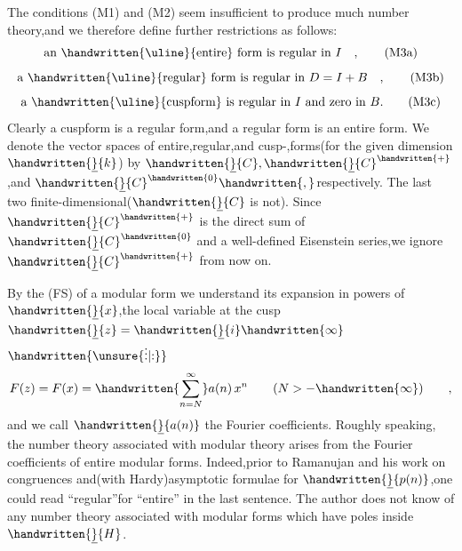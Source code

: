 The conditions (M1) and (M2) seem insufficient to produce much number theory,and we therefore define further restrictions as follows:
\[
\text{an \handwritten{\uline}{entire} form is regular in } I\quad ,
\tag*{(M3a)}
\]
\[
\text{a \handwritten{\uline}{regular} form is regular in } D=I+B\quad ,
\tag*{(M3b)}
\]
\[
\text{a \handwritten{\uline}{cuspform} is regular in } I \text{ and zero in } B.
\tag*{(M3c)}
\]
Clearly a cuspform is a regular form,and a regular form is an entire form. We denote the vector spaces of entire,regular,and cusp-,forms(for the given dimension $\handwritten{\underline}{k}$) by $\handwritten{\underline}{C},\handwritten{\underline}{C}^{\handwritten{+}}$,and $\handwritten{\underline}{C}^{\handwritten{0}}\handwritten{,}$respectively. The last two  finite-dimensional($\handwritten{\underline}{C}$ is not). Since $\handwritten{\underline}{C}^{\handwritten{+}}$ is the direct sum of $\handwritten{\underline}{C}^{\handwritten{0}}$ and a well-defined Eisenstein series,we ignore $\handwritten{\underline}{C}^{\handwritten{+}}$ from now on.

By the   (FS)\unsure{-} of a modular form we understand its expansion in powers of $\handwritten{\underline}{x}$,the local variable at the cusp $\handwritten{\underline}{z}=\handwritten{\underline}{i}\handwritten{\infty}$ $\handwritten{\unsure{\vdots|\mathord{:}}}$
\[
F(z)=F(x)=\handwritten{\sum_{n=N}^{\infty}}a(n)\,x^{n}\qquad (N>-\handwritten{\infty})\qquad ,
\]
and we call \reversemarginpar{}\normalmarginpar $\handwritten{\underline}{a(n)}$ the Fourier coefficients. Roughly speaking, the number theory associated with modular theory arises from the Fourier coefficients of entire modular forms. Indeed,prior to Ramanujan and his work on congruences and(with Hardy)asymptotic formulae for $\handwritten{\underline}{p(n)}$,one could read ``regular''for ``entire'' in the last sentence. The author does not know of any number theory associated with modular forms which have poles inside $\handwritten{\underline}{H}$.
\endgroup

